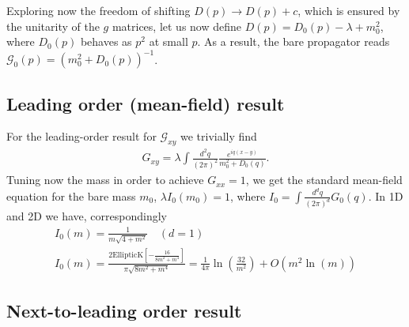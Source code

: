 \documentclass[12pt]{article}
\newcommand{\lr}[1]{ \left( #1 \right) }
\newcommand{\G}{\mathcal{G}}
\begin{document}
Exploring now the freedom of shifting $D\lr{p} \rightarrow D\lr{p} + c$, which is ensured by the unitarity of the $g$ matrices, let us now define $D\lr{p} = D_0\lr{p} - \lambda + m_0^2$, where $D_0\lr{p}$ behaves as $p^2$ at small $p$. As a result, the bare propagator reads $\G_0\lr{p} = \lr{m_0^2 + D_0\lr{p}}^{-1}$.

\subsection*{Leading order (mean-field) result}

For the leading-order result for $\G_{x y}$ we trivially find
\begin{eqnarray}
\label{order0}
 G_{x y} = \lambda \int \frac{d^2 q}{\lr{2 \pi}^2} \frac{e^{i q \lr{x - y}}}{m_0^2 + D_0\lr{q}} .
\end{eqnarray}
Tuning now the mass in order to achieve $G_{xx} = 1$, we get the standard mean-field equation for the bare mass $m_0$, $\lambda I_0\lr{m_0} = 1$, where $I_0 = \int \frac{d^d q}{\lr{2 \pi}^d} G_0\lr{q}$. In 1D and 2D we have, correspondingly
\begin{eqnarray}
\label{lattice_I0_1D}
 I_0\lr{m} = \frac{1}{m \sqrt{4 + m^2}} \quad (d = 1)
 \nonumber \\
\label{lattice_I0_2D}
 I_0\lr{m} = \frac{2 \text{EllipticK}\left[-\frac{16}{8 m^2 + m^4}\right]}{\pi  \sqrt{8 m^2 + m^4}} =
 \frac{1}{4 \pi} \ln\lr{\frac{32}{m^2}} + O\lr{m^2 \ln\lr{m}}
\end{eqnarray}

\subsection*{Next-to-leading order result}
\end{document}
